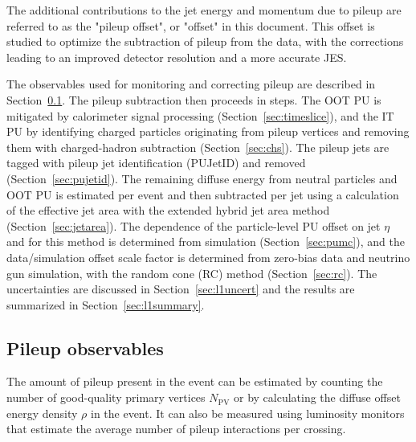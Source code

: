 \documentclass[11pt,twoside,a4paper,cmspaper,final,collab]{cms-tdr}
\begin{document}
The additional contributions to the jet energy and momentum due to pileup are referred to as the "pileup offset", or "offset" in this document. This offset is studied to optimize the subtraction of pileup from the data, with the corrections leading to an improved detector resolution and a more accurate JES.

The observables used for monitoring and correcting pileup are described in Section~\ref{sec:puobs}. The pileup subtraction then proceeds in steps. The OOT PU is mitigated by calorimeter signal processing (Section~\ref{sec:timeslice}), and the IT PU by identifying charged particles originating from pileup vertices and removing them with charged-hadron subtraction (Section~\ref{sec:chs}). The pileup jets are tagged with pileup jet identification (PUJetID) and removed (Section~\ref{sec:pujetid}). The remaining diffuse energy from neutral particles and OOT PU is estimated per event and then subtracted per jet using a calculation of the effective jet area with the extended hybrid jet area method (Section~\ref{sec:jetarea}). The dependence of the particle-level PU offset on jet $\eta$ and \pt for this method is determined from simulation (Section~\ref{sec:pumc}), and the data/simulation offset scale factor is determined from zero-bias data and neutrino gun simulation, with the random cone (RC) method (Section~\ref{sec:rc}). The uncertainties are discussed in Section~\ref{sec:l1uncert} and the results are summarized in Section~\ref{sec:l1summary}.

\subsection{Pileup observables}
\label{sec:puobs}

The amount of pileup present in the event can be estimated by counting the number of good-quality primary vertices $N_\mathrm{PV}$ or by calculating the diffuse offset energy density $\rho$ \cite{fastjet,fastjetB} in the event. It can also be measured using luminosity monitors that estimate the average number of pileup interactions per crossing.
\end{document}
